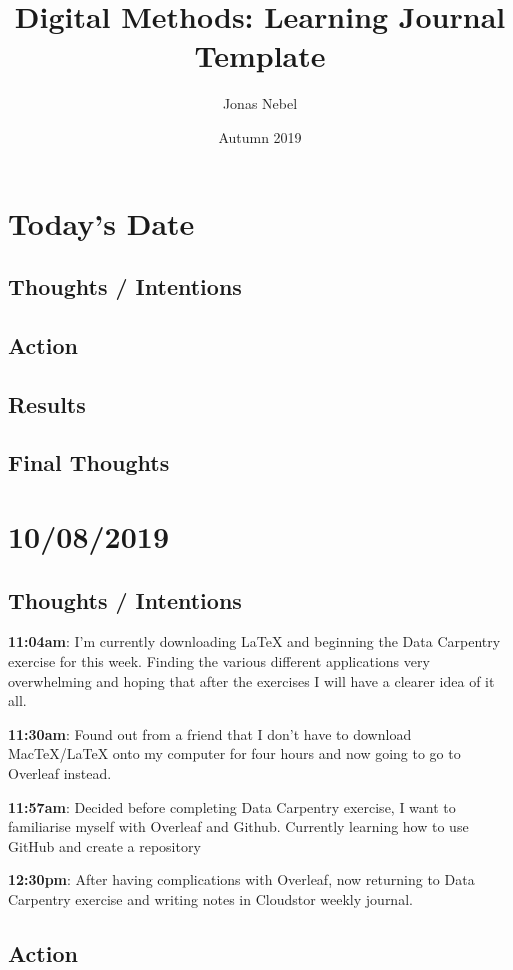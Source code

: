 \documentclass{article}
\title{Digital Methods: Learning Journal Template}
\author{Jonas Nebel}
\date{Autumn 2019}
\begin{document}
\maketitle

\section{Today's Date}
\subsection{Thoughts / Intentions}
\subsection{Action}
\subsection{Results}
\subsection{Final Thoughts}

\pagebreak{}

\section{10/08/2019}
\subsection{Thoughts / Intentions}

\textbf{11:04am}: I’m currently downloading LaTeX and beginning the Data Carpentry exercise for this week. Finding the various different applications very overwhelming and hoping that after the exercises I will have a clearer idea of it all. 


\textbf{11:30am}: Found out from a friend that I don’t have to download MacTeX/LaTeX onto my computer for four hours and now going to go to Overleaf instead. 


\textbf{11:57am}: Decided before completing Data Carpentry exercise, I want to familiarise myself with Overleaf and Github. Currently learning how to use GitHub and create a repository 


\textbf{12:30pm}: After having complications with Overleaf, now returning to Data Carpentry exercise and writing notes in Cloudstor weekly journal. 

\subsection{Action}
\end{document}
